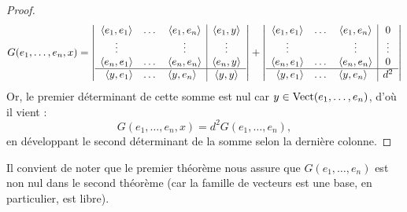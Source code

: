 \begin{proof}
\[ G(e_1, \dots, e_n, x) =
\left | \begin{array}{c | c}
\begin{matrix}
\langle e_1, e_1\rangle & \dots & \langle e_1, e_n\rangle \\
\vdots & & \vdots \\
\langle e_n, e_1\rangle & \dots & \langle e_n, e_n\rangle
\end{matrix} & \begin{matrix} \langle e_1, y\rangle \\ \vdots \\ \langle e_n, y\rangle \end{matrix} \\
\hline 
\begin{matrix} \langle y, e_1\rangle & \dots & \langle y, e_n\rangle \end{matrix} & \langle y,y\rangle
\end{array} \right |
+ \left | \begin{array}{c | c}
\begin{matrix}
\langle e_1, e_1\rangle & \dots & \langle e_1, e_n\rangle \\
\vdots & & \vdots \\
\langle e_n, e_1\rangle & \dots & \langle e_n, e_n\rangle
\end{matrix} & \begin{matrix} 0 \\ \vdots \\ 0 \end{matrix} \\
\hline 
\begin{matrix} \langle y, e_1\rangle & \dots & \langle y, e_n\rangle \end{matrix} & d^2
\end{array} \right | \]
Or, le premier déterminant de cette somme est nul car $y \in \operatorname{Vect}(e_1, \dots, e_n)$, d'où il vient :
\[ G(e_1, \dots, e_n, x) = d^2 G(e_1, \dots, e_n) , \]
en développant le second déterminant de la somme selon la dernière colonne.
\end{proof}

\begin{rmq}
Il convient de noter que le premier théorème nous assure que $G(e_1, \dots, e_n)$ est non nul dans le second théorème 
(car la famille de vecteurs est une base, en particulier, est libre).
\end{rmq}

